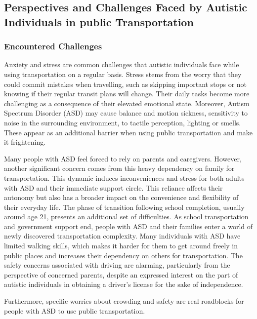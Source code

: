 \subsection{Perspectives and Challenges Faced by Autistic Individuals in public Transportation}

\subsubsection{Encountered Challenges}

Anxiety and stress are common challenges that autistic individuals face while using transportation on a regular basis\cite{2020ExperiencesYoungAutistic}. Stress stems from the worry that they could commit mistakes when travelling, such as skipping important stops or not knowing if their regular transit plans will change. Their daily tasks become more challenging as a consequence of their elevated emotional state.  Moreover, Autism Spectrum Disorder (ASD) may cause balance and motion sickness, sensitivity to noise in the surrounding environment, to tactile perception, lighting or smells. These appear as an additional barrier when using public transportation and make it frightening.

Many people with ASD feel forced to rely on parents and caregivers. However, another significant concern comes from this heavy dependency on family for transportation. This dynamic induces inconveniences and stress for both adults with ASD and their immediate support circle\cite{2015DetourRightPlace}. This reliance affects their autonomy but also has a broader impact on the convenience and flexibility of their everyday life. The phase of transition following school completion, usually around age 21, presents an additional set of difficulties. As school transportation and government support end,  people with ASD and their families enter a world of newly discovered transportation complexity. Many individuals with ASD have limited walking skills, which makes it harder for them to get around freely in public places and increases their dependency on others for transportation. The safety concerns associated with driving are alarming, particularly from the perspective of concerned parents, despite an expressed interest on the part of autistic individuals in obtaining a driver's license for the sake of independence.

Furthermore, specific worries about crowding and safety are real roadblocks for people with ASD to use public transportation\cite{2015ViewpointsAdultsAutism}.

